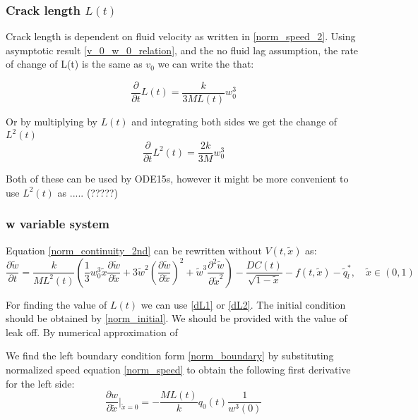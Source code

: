 \subsubsection{Crack length $L(t)$}
Crack length is dependent on fluid velocity as written in \eqref{norm_speed_2}. Using asymptotic result \eqref{v_0_w_0_relation}, and the no fluid lag assumption, the rate of change of L(t) is the same as $v_0$ we can write the that:

\begin{equation}\label{dL1}
\frac{\partial}{\partial t}L(t)=\frac{k}{3ML(t)}w_0^3
\end{equation}

Or by multiplying by $L(t)$ and integrating both sides we get the change of $L^2(t)$
\begin{equation}\label{dL2}
\frac{\partial}{\partial t}L^2(t)=\frac{2k}{3M}w_0^3
\end{equation}

Both of these can be used by ODE15s, however it might be more convenient to use $L^2(t)$ as ..... (?????)

\subsubsection{w variable system}
Equation \eqref{norm_continuity_2nd} can be rewritten without $V(t,\tilde x)$ as:
\begin{equation}\label{w_uklad}
\frac{\partial \tilde w}{\partial t}=\frac{k}{ML^2(t)}\left(\frac{1}{3}w_0^3\tilde x\frac{\partial \tilde w}{\partial \tilde x}+3\tilde w^2\left(\frac{\partial \tilde w}{\partial  \tilde x}\right)^2+\tilde w^3\frac{\partial^2 \tilde w}{\partial \tilde x^2}\right)
-\frac{DC(t)}{\sqrt{1-\tilde{x}}}-f(t,\tilde{x})-\tilde q_l^*, \quad \tilde x\in(0,1)
\end{equation}

For finding the value of $L(t)$ we can use \eqref{dL1} or \eqref{dL2}. The initial condition should be obtained by \eqref{norm_initial}. We should be provided with the value of leak off. By numerical approximation of 

We find the left boundary condition form \eqref{norm_boundary} by substituting normalized speed equation \eqref{norm_speed} to obtain the following first derivative for the left side:
\begin{equation}\label{dwdx_left}
\frac{\partial w}{\partial \tilde x}|_{\tilde x=0}=-\frac{ML(t)}{k}q_0(t)\frac{1}{w^3(0)}
\end{equation}

